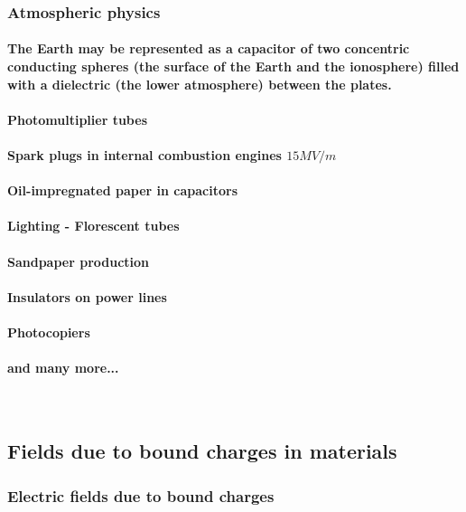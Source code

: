 \documentclass{article}
\begin{document}
\subsubsection{Atmospheric physics}
\paragraph{The Earth may be represented as a capacitor of two concentric conducting spheres (the surface of the Earth and the ionosphere) filled with a dielectric (the lower atmosphere) between the plates.}
\paragraph{\indent Photomultiplier tubes}
\paragraph{\indent Spark plugs in internal combustion engines $15MV/m$}
\paragraph{\indent Oil-impregnated paper in capacitors}
\paragraph{\indent Lighting - Florescent tubes}
\paragraph{\indent Sandpaper production}
\paragraph{\indent Insulators on power lines}
\paragraph{\indent Photocopiers}
\paragraph{\indent and many more... }
\
\subsection{Fields due to bound charges in materials}
\subsubsection{Electric fields due to bound charges}
\end{document}
